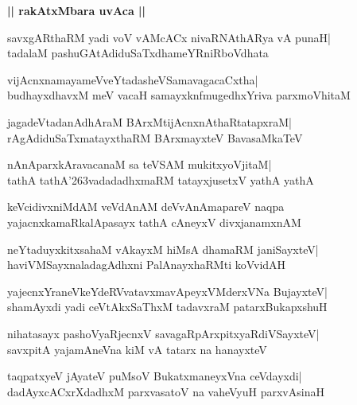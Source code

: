\documentclass[twoside,12pt,openright]{book}
\def\S{\char'263}
\newcounter{shloka}[chapter]
\def\uvaca#1{\centerline{{\large\textbf{#1}}}}
\begin{document}
\uvaca{|| rakAtxMbara uvAca ||}
\begin{shloka}%
savxgARthaRM yadi voV vAMcACx nivaRNAthARya vA punaH|\\
tadalaM pashuGAtAdiduSaTxdhameYRniRboVdhata
\end{shloka}

\begin{shloka}%
vijAcnxnamayameVveYtadasheVSamavagacaCxtha|\\
budhayxdhavxM meV vacaH samayxknfmugedhxYriva parxmoVhitaM
\end{shloka}

\begin{shloka}%
jagadeVtadanAdhAraM BArxMtijAcnxnAthaRtatapxraM|\\
rAgAdiduSaTxmatayxthaRM BArxmayxteV BavasaMkaTeV
\end{shloka}

\begin{shloka}%
nAnAparxkAravacanaM sa teVSAM mukitxyoVjitaM|\\
tathA tathA\S vadadadhxmaRM tatayxjusetxV yathA yathA
\end{shloka}

\begin{shloka}%
keVcidivxniMdAM veVdAnAM deVvAnAmapareV naqpa\\
yajacnxkamaRkalApasayx tathA cAneyxV divxjanamxnAM
\end{shloka}

\begin{shloka}%
neYtaduyxkitxsahaM vAkayxM hiMsA dhamaRM janiSayxteV|\\
haviVMSayxnaladagAdhxni PalAnayxhaRMti koVvidAH
\end{shloka}

\begin{shloka}%
yajecnxYraneVkeYdeRVvatavxmavApeyxVMderxVNa BujayxteV|\\
shamAyxdi yadi ceVtAkxSaThxM tadavxraM patarxBukapxshuH
\end{shloka}

\begin{shloka}%
nihatasayx pashoVyaRjecnxV savagaRpArxpitxyaRdiVSayxteV|\\
savxpitA yajamAneVna kiM vA tatarx na hanayxteV
\end{shloka}

\begin{shloka}%
taqpatxyeV jAyateV puMsoV BukatxmaneyxVna ceVdayxdi|\\
dadAyxcACxrXdadhxM parxvasatoV na vaheVyuH parxvAsinaH
\end{shloka}
\end{document}
